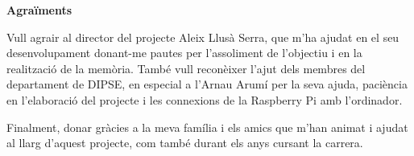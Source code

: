\centerline{\textbf{Agraïments}}
Vull agrair al director del projecte Aleix Llusà Serra, que m'ha ajudat en el seu desenvolupament
donant-me pautes per l'assoliment de l'objectiu i en la realització de la memòria.
També vull reconèixer l'ajut dels membres del departament de DIPSE, en especial a l'Arnau Arumí per la seva
ajuda, paciència en l'elaboració del projecte i les connexions de la Raspberry Pi amb l'ordinador.

Finalment, donar gràcies a la meva família i els amics que m'han animat i ajudat al llarg
d'aquest projecte, com també durant els anys cursant la carrera.